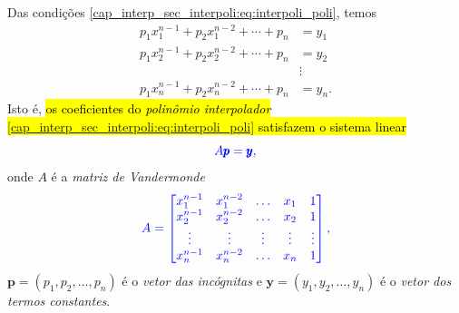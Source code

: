 Das condições \eqref{cap_interp_sec_interpoli:eq:interpoli_poli}, temos
\begin{equation}\label{cap_interp_sec_interpoli:eq:interpoli_sis}
  \begin{aligned}
    p_1x_1^{n-1} + p_2x_1^{n-2} + \cdots + p_n &= y_1 \\
    p_1x_2^{n-1} + p_2x_2^{n-2} + \cdots + p_n &= y_2 \\
    &\vdots \\
    p_1x_n^{n-1} + p_2x_n^{n-2} + \cdots + p_n &= y_n.
  \end{aligned}
\end{equation}
Isto é, \hl{os coeficientes do \emph{polinômio interpolador} {\eqref{cap_interp_sec_interpoli:eq:interpoli_poli}} satisfazem o sistema linear}
\begin{equation}\color{blue}A\pmb{p} = \pmb{y},
\end{equation}
onde $A$ é a \emph{matriz de Vandermonde}{\vandermonde}
\begin{equation}\color{blue}A =
  \begin{bmatrix}
    x_1^{n-1} & x_1^{n-2} & \ldots & x_1 & 1 \\
    x_2^{n-1} & x_2^{n-2} & \ldots & x_2 & 1 \\
    \vdots  & \vdots  & \vdots  & \vdots & \vdots \\
    x_n^{n-1} & x_n^{n-2} & \ldots & x_n & 1
  \end{bmatrix},
\end{equation}
$\pmb{p} = (p_1, p_2, \ldots, p_n)$ é o \emph{vetor das incógnitas} e $\pmb{y} = (y_1, y_2, \ldots, y_n)$ é o \emph{vetor dos termos constantes}.

